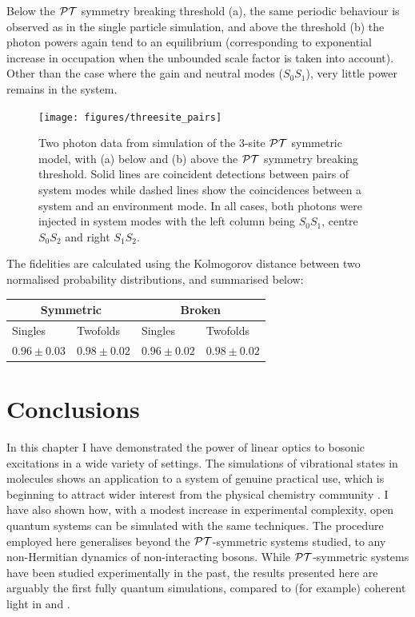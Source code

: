 Below the \(\mathcal{PT}\) symmetry breaking
threshold (a), the same periodic behaviour is observed as in the single particle
simulation, and above the threshold (b) the photon powers again tend to an
equilibrium (corresponding to exponential increase in occupation when the
unbounded scale factor is taken into account). Other than the case where the
gain and neutral modes (\(S_{0}S_{1}\)), very little power remains in the
system.

\begin{figure}[p]
  \centering
  \texttt{[image: figures/threesite\_pairs]}
  \caption[Two photon data from simulation of the 3-site PT symmetric model]
  {Two photon data from simulation of the 3-site \(\mathcal{PT}\) symmetric model, with
  (a) below and (b) above the \(\mathcal{PT}\) symmetry breaking threshold. Solid lines
  are coincident detections between pairs of system modes while dashed lines
  show the coincidences between a system and an environment mode. In all cases,
  both photons were injected in system modes with the left column being
  \(S_{0}S_{1}\), centre \(S_{0}S_{2}\) and right \(S_{1}S_{2}\).}
  \label{fig:threesitetwofolds}
\end{figure}

The fidelities are calculated using the Kolmogorov distance between two
normalised probability distributions, and summarised below:

\begin{tabular}{|l|l|l|l|}
  \hline
  \multicolumn{2}{|c|}{Symmetric} & \multicolumn{2}{|c|}{Broken} \\
  \hline
  Singles & Twofolds & Singles & Twofolds \\
  \hline
  \(0.96 \pm 0.03\) & \(0.98 \pm 0.02\) & \(0.96 \pm 0.02\) &
  \(0.98 \pm 0.02\) \\
  \hline
\end{tabular}

\section{Conclusions}
In this chapter I have demonstrated the power of linear optics to bosonic
excitations in a wide variety of settings. The simulations of vibrational states
in molecules shows an application to a system of genuine practical use,
which is beginning to attract wider interest from the physical chemistry
community \cite{vibronics}. I have also shown how, with a modest increase in
experimental complexity, open quantum systems can be simulated with the same
techniques. The procedure employed here generalises beyond the \(\mathcal{PT}\)-symmetric
systems studied, to any non-Hermitian dynamics of non-interacting bosons. While
\(\mathcal{PT}\)-symmetric systems have been studied experimentally in the past, the
results presented here are arguably the first fully quantum simulations,
compared to (for example) coherent light in \cite{pt-ruter} and
\cite{pt-regensburger}.

